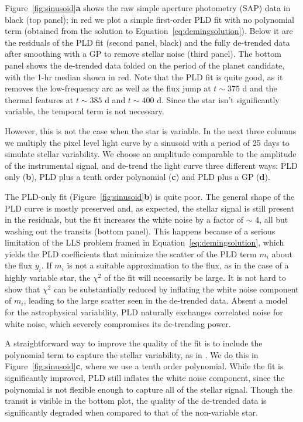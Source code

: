 \documentclass[]{emulateapj}
\begin{document}
Figure~\ref{fig:sinusoid}\textbf{a} shows the raw simple aperture photometry (SAP) data in black (top
panel); in red we plot a simple first-order PLD fit with no polynomial term (obtained
from the solution to Equation~\ref{eq:demingsolution}). Below it are 
the residuals of the PLD fit (second panel, black) and the fully de-trended data after 
smoothing with a GP to remove stellar noise (third panel). The bottom panel shows 
the de-trended data folded on the period of the planet candidate, with the 1-hr 
median shown in red. Note that the PLD fit is quite good, as it removes the
low-frequency arc as well as the flux jump at $t \sim 375$ d and the thermal 
features at $t \sim 385$ d and $t \sim 400$ d. Since the star
isn't significantly variable, the temporal term is not necessary.

However, this is not the case when the star is variable. In the next three columns 
we multiply the pixel level light curve by a sinusoid 
with a period of 25 days to simulate stellar variability. We choose an amplitude 
comparable to the amplitude of the instrumental signal, and de-trend the light 
curve three different ways: PLD only (\textbf{b}), PLD plus a tenth order 
polynomial (\textbf{c}) and PLD plus a GP (\textbf{d}).

The PLD-only fit (Figure~\ref{fig:sinusoid}\textbf{b}) is quite poor. The general shape of the PLD
curve is mostly preserved and, as expected, the stellar signal is still present 
in the residuals, but the fit increases the white noise by a factor of $\sim$ 4,
all but washing out the transits (bottom panel). This happens because of a
serious limitation of the LLS problem framed in Equation~\ref{eq:demingsolution}, 
which yields the PLD coefficients that minimize the scatter of the PLD term $m_i$ 
about the flux $y_i$. If $m_i$ is not a suitable approximation to the flux, as in the case
of a highly variable star, the $\chi^2$ of the fit will necessarily be large.
It is not hard to show that $\chi^2$ can be substantially reduced
by inflating the white noise component of $m_i$, leading to the large scatter
seen in the de-trended data. Absent a model for the astrophysical variability,
PLD naturally exchanges correlated noise for white noise, which severely
compromises its de-trending power. 

A straightforward way to improve the quality of the fit is to include the polynomial
term to capture the stellar variability, as in \cite{DEM15}. We do this in Figure~\ref{fig:sinusoid}\textbf{c}, 
where we use a tenth order polynomial. While the fit is significantly
improved, PLD still inflates the white noise component, since the polynomial is 
not flexible enough to capture all of the stellar signal. Though the transit is
visible in the bottom plot, the quality of the de-trended data is significantly
degraded when compared to that of the non-variable star.
\end{document}
